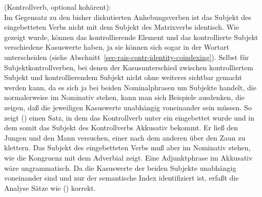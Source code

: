 {\eas
\label{le-versuchen-incoh}%
 (Kontrollverb, optional kohärent):\\
\onems{
cat$|$subcat  \sliste{ NP[\textit{str\/}]\ind{1}  } $\oplus$ \ibox{2} $\oplus$ \sliste{ \textrm{V[}%
\begin{tabular}[t]{@{}l@{}}
                                   \textit{inf}, \textsc{subj} \sliste{NP[\textit{str\/}]\ind{1}},\\
                                   \textsc{subcat}~\ibox{2} ]:\ibox{3}\\
                                   \end{tabular}
         }\\
cont \ms[versuchen]{
        agens       & \ibox{1}\\
        soa & \ibox{3}\\
       }\\
}%
\zs
Im Gegensatz zu den bisher diskutierten Anhebungsverben ist das Subjekt des eingebetteten Verbs
nicht mit dem Subjekt des Matrixverbs identisch. Wie gezeigt wurde, können das kontrollierende
Element und das kontrollierte Subjekt verschiedene Kasuswerte haben, ja sie können sich sogar
in der Wortart unterscheiden (siehe Abschnitt~\ref{sec-rais-contr-identity-coindexing}).
Selbst für Subjektkontrollverben, bei denen der Kasusunterschied zwischen kontrolliertem
Subjekt und kontrollierendem Subjekt nicht ohne weiteres sichtbar gemacht werden kann, da
es sich ja bei beiden Nominalphrasen um Subjekte handelt, die normalerweise im Nominativ
stehen, kann man sich Beispiele ausdenken, die zeigen, daß die jeweiligen Kasuswerte
unabhängig voneinander sein müssen. So zeigt () einen Satz, in dem das Kontrollverb
unter ein \aciv eingebettet wurde und in dem somit das Subjekt des Kontrollverbs Akkusativ bekommt.
%
%
\ea
Er ließ den Jungen und den Mann versuchen, einer nach dem anderen über den Zaun zu klettern.
\z
Das Subjekt des eingebetteten Verbs muß aber im Nominativ stehen, wie die Kongruenz mit dem Adverbial zeigt.
Eine Adjunktphrase im Akkusativ wäre ungrammatisch. Da die Kasuswerte der beiden Subjekte unabhängig voneinander sind
und nur der semantische Index identifiziert ist, erfaßt die Analyse Sätze wie () korrekt.

}
